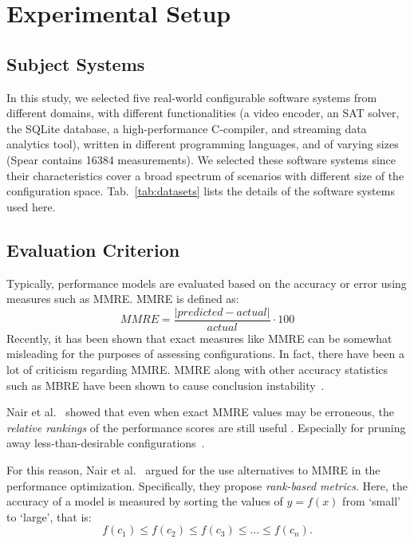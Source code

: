 \documentclass[10pt,journal,compsoc]{IEEEtran}
\newcommand{\tab}[1]{Tab.~\ref{tab:#1}}
\begin{document}
\section{Experimental Setup}
\label{sect:expt}
\subsection{Subject Systems}
\label{sect:datasets}
In this study, we selected five real-world configurable software systems from different domains, with different functionalities (a video encoder, an SAT solver, the SQLite database, a high-performance C-compiler, and streaming data analytics tool), written in different programming languages, and of varying sizes (Spear contains 16384 measurements). We selected these software systems since their characteristics cover a broad spectrum of scenarios with different size of the configuration space. \tab{datasets} lists the details of the software systems used here.

\subsection{Evaluation Criterion}
\label{sect:eval}
Typically, performance models are evaluated based on the accuracy or error using measures such as MMRE. 
 MMRE is defined as:
\[
    MMRE = \frac{|predicted-actual|}{actual} \cdot 100
\]
Recently, it has been shown that exact measures like MMRE
can be somewhat misleading for the purposes of assessing
configurations.
In fact, there have been a lot of criticism regarding MMRE. MMRE along with other accuracy statistics such as MBRE have been shown to cause conclusion instability~\cite{myrtveit2012validity, myrtveit2005reliability, foss2003simulation}.

Nair et al.~\cite{nair2017using} showed that even when exact MMRE values may be erroneous, the {\em relative rankings} of the  performance scores are still useful . Especially for pruning away less-than-desirable
configurations~\cite{nair2017using}.    


For this reason, Nair et al.~\cite{nair2017using} argued for the use alternatives to MMRE in the performance optimization. Specifically, they propose \textit{rank-based metrics}. Here, the accuracy of a model is measured  by sorting the values of $y=f(x)$ from `small' to `large', that is:
\begin{equation}
    f(c_1) \le f(c_2) \le f(c_3) \le ... \le f(c_n).
\end{equation}
\end{document}
